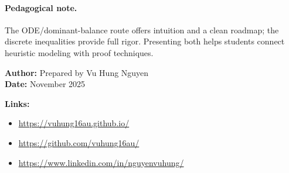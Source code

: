 \documentclass{article}
\begin{document}
\paragraph{Pedagogical note.}
The ODE/dominant-balance route offers intuition and a clean roadmap; the discrete inequalities provide full rigor. Presenting both helps students connect heuristic modeling with proof techniques.

\newpage

\noindent\textbf{Author:} Prepared by Vu Hung Nguyen \\
\textbf{Date:} November 2025 \\
\vspace{0.3cm}


\textbf{Links:}
\begin{itemize}
    \item \href{https://vuhung16au.github.io/}{https://vuhung16au.github.io/}
    \item \href{https://github.com/vuhung16au/}{https://github.com/vuhung16au/}
    \item \href{https://www.linkedin.com/in/nguyenvuhung/}{https://www.linkedin.com/in/nguyenvuhung/}
\end{itemize}
\end{document}
